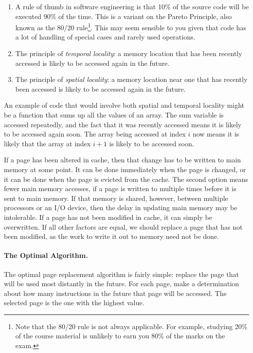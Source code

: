 \begin{enumerate}
	\item A rule of thumb in software engineering is that 10\% of the source code will be executed 90\% of the time. This is a variant on the Pareto Principle, also known as the 80/20 rule\footnote{Note that the 80/20 rule is not always applicable. For example, studying 20\% of the course material is unlikely to earn you 80\% of the marks on the exam.}. This may seem sensible to you given that code has a lot of handling of special cases and rarely used operations.
	\item The principle of \textit{temporal locality}: a memory location that has been recently accessed is likely to be accessed again in the future. 
	\item The principle of \textit{spatial locality}: a memory location near one that has recently been accessed is likely to be accessed again in the future.
\end{enumerate}

An example of code that would involve both spatial and temporal locality might be a function that sums up all the values of an array. The sum variable is accessed repeatedly, and the fact that it was recently accessed means it is likely to be accessed again soon. The array being accessed at index $i$ now means it is likely that the array at index $i+1$ is likely to be accessed soon.

If a page has been altered in cache, then that change has to be written to main memory at some point. It can be done immediately when the page is changed, or it can be done when the page is evicted from the cache. The second option means fewer main memory accesses, if a page is written to multiple times before it is sent to main memory. If that memory is shared, however, between multiple processors or an I/O device, then the delay in updating main memory may be intolerable. If a page has not been modified in cache, it can simply be overwritten. If all other factors are equal, we should replace a page that has not been modified, as the work to write it out to memory need not be done.

\paragraph{The Optimal Algorithm.}
The optimal page replacement algorithm is fairly simple: replace the page that will be used most distantly in the future. For each page, make a determination about how many instructions in the future that page will be accessed. The selected page is the one with the highest value.

